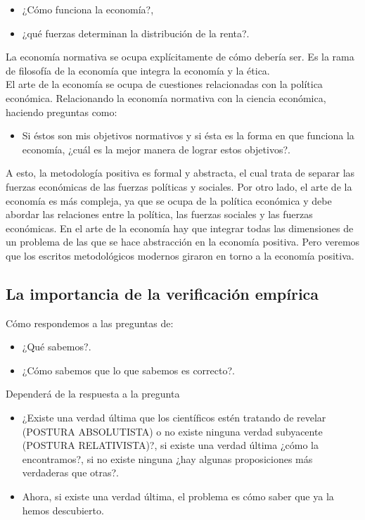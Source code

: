 \documentclass[10pt]{book}
\begin{document}
\begin{itemize}
    \item ¿Cómo funciona la economía?,
    \item ¿qué fuerzas determinan la distribución de la renta?.
\end{itemize}

La economía normativa se ocupa explícitamente de cómo debería ser. Es la rama de filosofía de la economía que integra la economía y la ética.\\

El arte de la economía se ocupa de cuestiones relacionadas con la política económica. Relacionando la economía normativa con la ciencia económica, haciendo preguntas como:

\begin{itemize}
    \item Si éstos son mis objetivos normativos y si ésta es la forma en que funciona la economía, ¿cuál es la mejor manera de lograr estos objetivos?.
\end{itemize}

A esto, la metodología positiva es formal y abstracta, el cual trata de separar las fuerzas económicas de las fuerzas políticas y sociales. Por otro lado, el arte de la economía es más compleja, ya que se ocupa de la política económica y debe abordar las relaciones entre la política, las fuerzas sociales y las fuerzas económicas. En el arte de la economía hay que integrar todas las dimensiones de un problema de las que se hace abstracción en la economía positiva. Pero veremos que los escritos metodológicos modernos giraron en torno a la economía positiva.


\subsection{La importancia de la verificación empírica}
Cómo respondemos a las preguntas de:

\begin{itemize}
    \item ¿Qué sabemos?.
    \item ¿Cómo sabemos que lo que sabemos es correcto?.
\end{itemize}

Dependerá de la respuesta a la pregunta

\begin{itemize}
    \item ¿Existe una verdad última que los científicos estén tratando de revelar (POSTURA ABSOLUTISTA) o no existe ninguna verdad subyacente (POSTURA RELATIVISTA)?, si existe una verdad última ¿cómo la encontramos?, si no existe ninguna ¿hay algunas proposiciones más verdaderas que otras?.
    \item Ahora, si existe una verdad última, el problema es cómo saber que ya la hemos descubierto.
\end{itemize}
\end{document}
